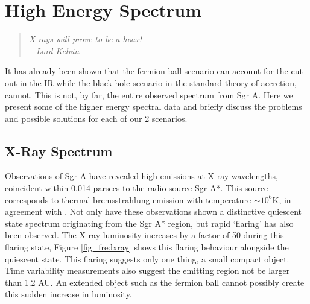 \section{High Energy Spectrum}
\begin{quotation}
	\raggedleft \it
	X-rays will prove to be a hoax! \\
	-- Lord Kelvin
\end{quotation}
It has already been shown that the fermion ball scenario can account for the cut-out in the IR while the black hole scenario in the
standard theory of accretion, cannot.
This is not, by far, the entire observed spectrum from Sgr A. Here we present some of the higher energy spectral data and briefly
discuss the problems and possible solutions for each of our 2 scenarios.

\subsection{X-Ray Spectrum}
Observations of Sgr A \cite{ref_baganoff} have revealed high emissions at X-ray wavelengths, coincident within 0.014 parsecs to the radio
source Sgr A*. This source corresponds to thermal bremsstrahlung emission with temperature $\sim 10^6$K, in agreement with \cite{ref_melia}.
Not only have these observations shown a distinctive quiescent state spectrum originating from the Sgr A* region,
but rapid `flaring' has also been observed. The X-ray luminosity increases by a
factor of 50 during this flaring state, Figure \ref{fig_fredxray} shows this flaring behaviour alongside the quiescent state.
This flaring suggests only one thing, a small compact object. Time variability measurements also suggest the emitting region not be larger
than 1.2 AU. An extended object such as the fermion ball cannot possibly create this sudden increase in luminosity.

